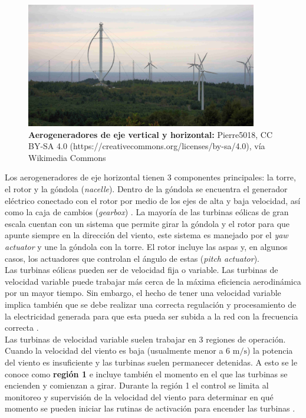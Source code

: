 {\begin{figure}[H]
    \centering
    \includegraphics[width=0.9\textwidth]{Imagenes/Eole_cap-chat.jpeg}
    \caption{\small{\textbf{Aerogeneradores de eje vertical y horizontal:} Pierre5018, CC BY-SA 4.0 (https://creativecommons.org/licenses/by-sa/4.0), vía Wikimedia Commons}}
    \label{VAWT}
\end{figure}

Los aerogeneradores de eje horizontal tienen 3 componentes principales: la torre, el rotor y la góndola (\emph{nacelle}). Dentro de la góndola se encuentra el generador eléctrico conectado con el rotor por medio de los ejes de alta y baja velocidad, así como la caja de cambios (\emph{gearbox}) \cite{Pao2009}. La mayoría de las turbinas eólicas de gran escala cuentan con un sistema que permite girar la góndola y el rotor para que apunte siempre en la dirección del viento, este sistema es manejado por el \emph{yaw actuator} y une la góndola con la torre. El rotor incluye las aspas y, en algunos casos, los actuadores que controlan el ángulo de estas (\emph{pitch actuator}). 
\\

Las turbinas eólicas pueden ser de velocidad fija o variable. Las turbinas de velocidad variable puede trabajar más cerca de la máxima eficiencia aerodinámica por un mayor tiempo. Sin embargo, el hecho de tener una velocidad variable implica también que se debe realizar una correcta regulación y procesamiento de la electricidad generada para que esta pueda ser subida a la red con la frecuencia correcta \cite{Pao2009}.
\\

Las turbinas de velocidad variable suelen trabajar en 3 regiones de operación. Cuando la velocidad del viento es baja (usualmente menor a 6 $\text{m}/\text{s}$) la potencia del viento es insuficiente y las turbinas suelen permanecer detenidas. A esto se le conoce como \textbf{región 1} e incluye también el momento en el que las turbinas se encienden y comienzan a girar. Durante la región 1 el control se limita al monitoreo y supervisión de la velocidad del viento para determinar en qué momento se pueden iniciar las rutinas de activación para encender las turbinas \cite{Johnson2004}.
\\

}
